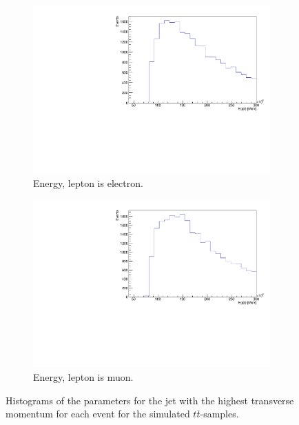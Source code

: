 \begin{figure}[H]
  \begin{subfigure}{0.45\textwidth}%
    \centering%
    \includegraphics[width=\textwidth]{plots/ttbar_distributions/ttbar.el_jet_E_max.pdf}%
    \caption{Energy, lepton is electron.}%
    \label{fig:4g}%
  \end{subfigure}%
  \hfill
  \begin{subfigure}{0.45\textwidth}%
    \centering%
    \includegraphics[width=\textwidth]{plots/ttbar_distributions/ttbar.mu_jet_E_max.pdf}%
    \caption{Energy, lepton is muon.}%
    \label{fig:4h}%
  \end{subfigure}%
  \caption{Histograms of the parameters for the jet with the highest transverse momentum for each event for the simulated $t \overline{t}$-samples.}%
  \label{fig:4}%
\end{figure}

